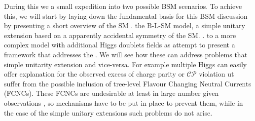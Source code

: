 

During this  we   a small expedition into two possible BSM scenarios.
%
To achieve this, we will start by laying down the fundamental basis for this BSM discussion by presenting a short overview of the SM .  the B-L-SM model, a simple unitary extension based on a apparently accidental symmetry of the SM.  .
%
 to a more complex model with additional Higgs doublets fields as  attempt to present a framework that addresses the . 
%
We will see how these   can address problems that  simple unitarity extension  and vice-versa. For example\Joaoadd{,} multiple Higgs  can easily offer  explanation for the observed excess of charge parity or $\mathcal{CP}$ violation ut suffer from the possible inclusion of tree-level Flavour Changing Neutral Currents (FCNCs). These FCNCs are undesirable\Joaoadd{,} at least in large number\Joaoadd{,} given  observations , so mechanisms have to be put in place to prevent them, while in the case of the simple unitary extensions such problems do not arise. 

%

